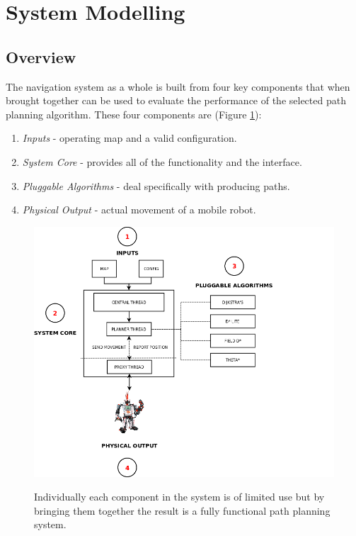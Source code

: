 \newpage


\section{System Modelling}

\subsection{Overview}
\noindent
The navigation system as a whole is built from four key components that when brought together can be used to evaluate the performance of the selected path planning algorithm. These four components are (Figure \ref{overview}):

\begin{enumerate}
\item \textit{Inputs} - operating map and a valid configuration.
\item \textit{System Core} - provides all of the functionality and the interface.
\item \textit{Pluggable Algorithms} - deal specifically with producing paths.
\item \textit{Physical Output} - actual movement of a mobile robot.
\end{enumerate}

\begin{figure}[htbp]

\center \includegraphics[width=325pt]{illustrations/overview.png}\\
\caption{Individually each component in the system is of limited use but by bringing them together the result is a fully functional path planning system.} 
\label{overview}

\end{figure}

